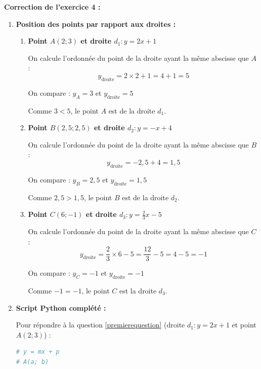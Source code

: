 \textbf{Correction de l'exercice 4 :}
		\begin{enumerate}
			\item \textbf{Position des points par rapport aux droites :}

			      \begin{enumerate}
				      \item \textbf{Point $A(2;3)$ et droite $d_1 : y = 2x + 1$}

				            On calcule l'ordonnée du point de la droite ayant la même abscisse que $A$ :
				            $$y_{\text{droite}} = 2 \times 2 + 1 = 4 + 1 = 5$$

				            On compare : $y_A = 3$ et $y_{\text{droite}} = 5$

				            Comme $3 < 5$, le point $A$ est  de la droite $d_1$.

				      \item \textbf{Point $B(2,5;2,5)$ et droite $d_2 : y = -x + 4$}

				            On calcule l'ordonnée du point de la droite ayant la même abscisse que $B$ :
				            $$y_{\text{droite}} = -2,5 + 4 = 1,5$$

				            On compare : $y_B = 2,5$ et $y_{\text{droite}} = 1,5$

				            Comme $2,5 > 1,5$, le point $B$ est  de la droite $d_2$.

				      \item \textbf{Point $C(6;-1)$ et droite $d_3 : y = \frac{2}{3}x - 5$}

				            On calcule l'ordonnée du point de la droite ayant la même abscisse que $C$ :
				            $$y_{\text{droite}} = \frac{2}{3} \times 6 - 5 = \frac{12}{3} - 5 = 4 - 5 = -1$$

				            On compare : $y_C = -1$ et $y_{\text{droite}} = -1$

				            Comme $-1 = -1$, le point $C$ est  la droite $d_3$.
			      \end{enumerate}

			\item \textbf{Script Python complété :}

			      Pour répondre à la question \ref{premierequestion} (droite $d_1 : y = 2x + 1$ et point $A(2;3)$) :

			      \begin{lstlisting}[language=Python]
# y = mx + p
# A(a; b) 
  

\end{lstlisting}
\end{enumerate}
